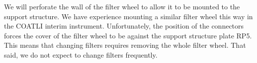 \documentclass{article}
\newcommand{\Hs}{\mbox{$H_\mathrm{s}$}}
\begin{document}
We will perforate the wall of the filter wheel to allow it to be mounted to the support structure. We have experience mounting a similar filter wheel this way in the COATLI interim instrument. Unfortunately, the position of the connectors forces the cover of the filter wheel to be against the support structure plate RP5. This means that changing filters requires removing the whole filter wheel. That said, we do not expect to change filters frequently.

%
%
%
%
\end{document}
